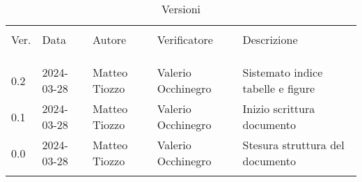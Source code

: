 \documentclass[12pt]{article} %
\begin{document}


\newpage



\begin{table}[!h]
	\caption*{Versioni}
	\begin{center}
		\begin{tabular}{ l l l l l }
			\hline                                                                                     \\[-2ex]
			Ver. & Data       & Autore        & Verificatore       & Descrizione                       \\
			\\[-2ex] \hline \\[-1.5ex]\\
			0.2  & 2024-03-28 & Matteo Tiozzo & Valerio Occhinegro & Sistemato indice tabelle e figure \\
			0.1  & 2024-03-28 & Matteo Tiozzo & Valerio Occhinegro & Inizio scrittura documento        \\
			0.0  & 2024-03-28 & Matteo Tiozzo & Valerio Occhinegro & Stesura struttura del documento   \\
			\\[-1.5ex] \hline
		\end{tabular}
	\end{center}
\end{table}

\newpage

\tableofcontents

\newpage

\listoftables

\listoffigures

\newpage




\end{document}
